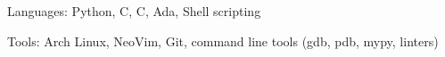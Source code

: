 \documentclass[10pt,letterpaper]{article}
\newenvironment{indentsection}[1]%
{\begin{list}{}%
	{\setlength{\leftmargin}{#1}}%
	\item[]%
}
{\end{list}}
\newcommand{\CPP}
{C\nolinebreak[4]\hspace{-.05em}\raisebox{.22ex}{\footnotesize\bf ++}}
\begin{document}
\begin{indentsection}{\parindent}
\begin{description*}
    \item[Languages:]
        Python, \CPP, C, Ada, Shell scripting
    \item[Tools:]
        Arch Linux, NeoVim, Git, command line tools (gdb, pdb, mypy, linters)
\end{description*}
\end{indentsection}
\end{document}
